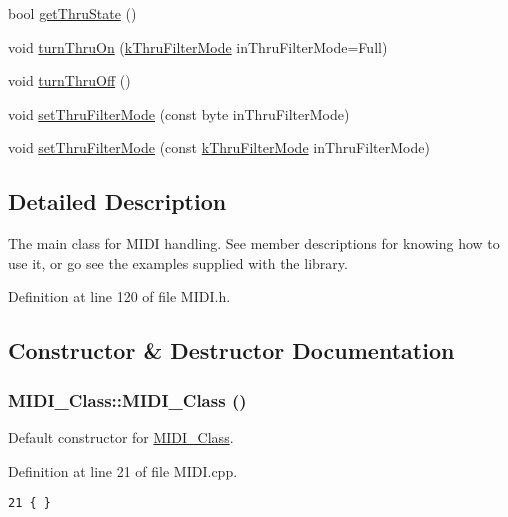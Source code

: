 \begin{CompactItemize}
\item 
bool \hyperlink{class_m_i_d_i___class_76c71d380b9221207062aa669a9c0005}{getThruState} ()
\item 
void \hyperlink{class_m_i_d_i___class_7fd1759eda22c18f6122b4231e1f0a6d}{turnThruOn} (\hyperlink{_m_i_d_i_8h_315ccd12c0a15c11eca5cc4acdb6397d}{kThruFilterMode} inThruFilterMode=Full)
\item 
void \hyperlink{class_m_i_d_i___class_c1999ba222737523008d6f1c579d6816}{turnThruOff} ()
\item 
void \hyperlink{class_m_i_d_i___class_be50e76aa11dc7127bd28659c181ab77}{setThruFilterMode} (const byte inThruFilterMode)
\item 
void \hyperlink{class_m_i_d_i___class_33d450180a10a36bef08e68015c4d922}{setThruFilterMode} (const \hyperlink{_m_i_d_i_8h_315ccd12c0a15c11eca5cc4acdb6397d}{kThruFilterMode} inThruFilterMode)
\end{CompactItemize}


\subsection{Detailed Description}
The main class for MIDI handling. See member descriptions for knowing how to use it, or go see the examples supplied with the library. 

Definition at line 120 of file MIDI.h.

\subsection{Constructor \& Destructor Documentation}
\hypertarget{class_m_i_d_i___class_5e395e8f748ec53a0818bffd0e2f176f}{
\subsubsection[{MIDI\_\-Class}]{\setlength{\rightskip}{0pt plus 5cm}MIDI\_\-Class::MIDI\_\-Class ()}}
\label{class_m_i_d_i___class_5e395e8f748ec53a0818bffd0e2f176f}


Default constructor for \hyperlink{class_m_i_d_i___class}{MIDI\_\-Class}. 

Definition at line 21 of file MIDI.cpp.

\begin{Code}\begin{verbatim}21 { }
\end{verbatim}
\end{Code}


